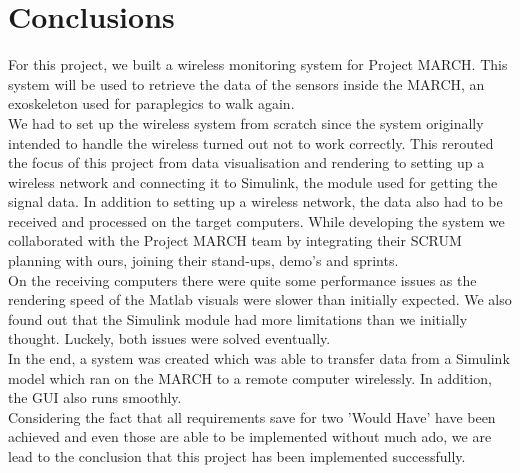 \chapter{Conclusions}

For this project, we built a wireless monitoring system for Project MARCH. This system will be used to retrieve the data of the sensors inside the MARCH, an exoskeleton used for paraplegics to walk again.\\	
We had to set up the wireless system from scratch since the system originally intended to handle the wireless turned out not to work correctly. This rerouted the focus of this project from data visualisation and rendering to setting up a wireless network and connecting it to Simulink, the module used for getting the signal data. In addition to setting up a wireless network, the data also had to be received and processed on the target computers. While developing the system we collaborated with the Project MARCH team by integrating their SCRUM planning with ours, joining their stand-ups, demo's and sprints.   \\
On the receiving computers there were quite some performance issues as the rendering speed of the Matlab visuals were slower than initially expected. We also found out that the Simulink module had more limitations than we initially thought. Luckely, both issues were solved eventually. \\
In the end, a system was created which was able to transfer data from a Simulink model which ran on the MARCH to a remote computer wirelessly. In addition, the GUI also runs smoothly. 
\\ Considering the fact that all requirements save for two 'Would Have' have been achieved and even those are able to be implemented without much ado, we are lead to the conclusion that this project has been implemented successfully.  